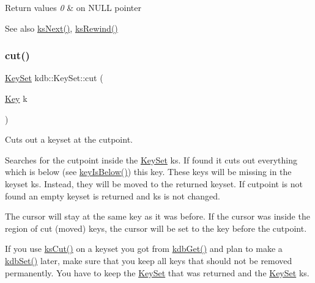 \begin{DoxyRetVals}{Return values}
{\em 0} & on N\+U\+LL pointer \\
\hline
\end{DoxyRetVals}
\begin{DoxySeeAlso}{See also}
\hyperlink{group__keyset_ga317321c9065b5a4b3e33fe1c399bcec9}{ks\+Next()}, \hyperlink{group__keyset_gabe793ff51f1728e3429c84a8a9086b70}{ks\+Rewind()} 
\end{DoxySeeAlso}
\mbox{\label{classkdb_1_1KeySet_ab283da798a7670d5c3f0e1a5b821e666}} 
\subsubsection{\texorpdfstring{cut()}{cut()}}
{\footnotesize\ttfamily \hyperlink{classkdb_1_1KeySet}{Key\+Set} kdb\+::\+Key\+Set\+::cut (\begin{DoxyParamCaption}\item[{\hyperlink{classkdb_1_1Key}{Key}}]{k }\end{DoxyParamCaption})\hspace{0.3cm}{\ttfamily [inline]}}



Cuts out a keyset at the cutpoint. 

Searches for the cutpoint inside the \hyperlink{classkdb_1_1KeySet}{Key\+Set} ks. If found it cuts out everything which is below (see \hyperlink{group__keytest_ga03332b5d97c76a4fd2640aca4762b8df}{key\+Is\+Below()}) this key. These keys will be missing in the keyset {\ttfamily ks}. Instead, they will be moved to the returned keyset. If {\ttfamily cutpoint} is not found an empty keyset is returned and {\ttfamily ks} is not changed.

The cursor will stay at the same key as it was before. If the cursor was inside the region of cut (moved) keys, the cursor will be set to the key before the cutpoint.

If you use \hyperlink{group__keyset_ga6b00cf82b59af4d883a9bad6cf4a4a4a}{ks\+Cut()} on a keyset you got from \hyperlink{group__kdb_ga28e385fd9cb7ccfe0b2f1ed2f62453a1}{kdb\+Get()} and plan to make a \hyperlink{group__kdb_ga11436b058408f83d303ca5e996832bcf}{kdb\+Set()} later, make sure that you keep all keys that should not be removed permanently. You have to keep the \hyperlink{classkdb_1_1KeySet}{Key\+Set} that was returned and the \hyperlink{classkdb_1_1KeySet}{Key\+Set} {\ttfamily ks}.

